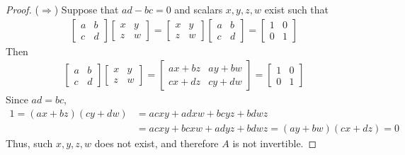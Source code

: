 \begin{proof}
	\noindent ($\Rightarrow$) Suppose that $ad - bc = 0$ and scalars $x, y, z, w$ exist such that \begin{align*}
	\begin{bmatrix}
	a & b \\ c & d
	\end{bmatrix} \begin{bmatrix}
	x & y \\ z & w
	\end{bmatrix} = \begin{bmatrix}
	x & y \\ z & w
	\end{bmatrix} \begin{bmatrix}
	a & b \\ c & d
	\end{bmatrix} = \begin{bmatrix}
	1 & 0 \\ 0 & 1
	\end{bmatrix}
	\end{align*}
	Then \begin{align*}
	\begin{bmatrix}
	a & b \\ c & d
	\end{bmatrix} \begin{bmatrix}
	x & y \\ z & w
	\end{bmatrix} = \begin{bmatrix}
	ax+bz & ay+bw \\ cx+dz & cy+dw
	\end{bmatrix} = \begin{bmatrix}
	1 & 0 \\ 0 & 1
	\end{bmatrix}
	\end{align*}
	Since $ad = bc$, \begin{align*}
	1 = (ax+bz)(cy+dw) &= acxy + adxw + bcyz + bdwz \\
	&= acxy + bcxw + adyz + bdwz = (ay+bw)(cx+dz) = 0
	\end{align*} Thus, such $x, y, z, w$ does not exist, and therefore $A$ is not invertible.
\end{proof}

